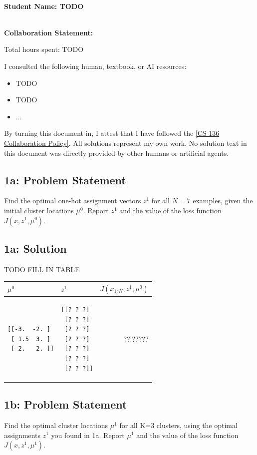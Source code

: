 \documentclass[10pt]{article}
\newcommand{\officialdirections}[1]{{\color{purple} #1}}
\begin{document}
~\\ %

{\Large{\bf Student Name: TODO}}

~\\ %
{\bf Collaboration Statement:}

Total hours spent: TODO

I consulted the following human, textbook, or AI resources:
\begin{itemize}
\item TODO
\item TODO
\item $\ldots$	
\end{itemize}

By turning this document in, I attest that I have followed the 
\href{https://www.cs.tufts.edu/cs/136/2026f/index.html#collaboration}{[CS 136 Collaboration Policy]}. All solutions represent my own work. No solution text in this document was directly provided by other humans or artificial agents. 

\tableofcontents

\newpage
\officialdirections{
\subsection*{1a: Problem Statement}
Find the optimal one-hot assignment vectors $z^1$ for all $N=7$ examples, given the initial cluster locations $\mu^0$. Report $z^1$ and the value of the loss function $J(x, z^1, \mu^0)$.
}

\subsection{1a: Solution}
TODO FILL IN TABLE

\begin{tabular}{p{5cm} | p{5cm} | r}
$\mu^0$ & $z^1$ & $J(x_{1:N}, z^1, \mu^0)$
\\
\midrule
\begin{verbatim}
[[-3.  -2. ]
 [ 1.5  3. ]
 [ 2.   2. ]]
\end{verbatim}
&	
\begin{verbatim}
[[? ? ?]
 [? ? ?]
 [? ? ?]
 [? ? ?]
 [? ? ?]
 [? ? ?]
 [? ? ?]]
\end{verbatim}
&
 ??.?????
\end{tabular}


\newpage
\officialdirections{
\subsection*{1b: Problem Statement}
 Find the optimal cluster locations $\mu^1$ for all K=3 clusters, using the optimal assignments $z^1$ you found in 1a. Report $\mu^1$ and the value of the loss function $J(x, z^1, \mu^1)$.}
\end{document}

